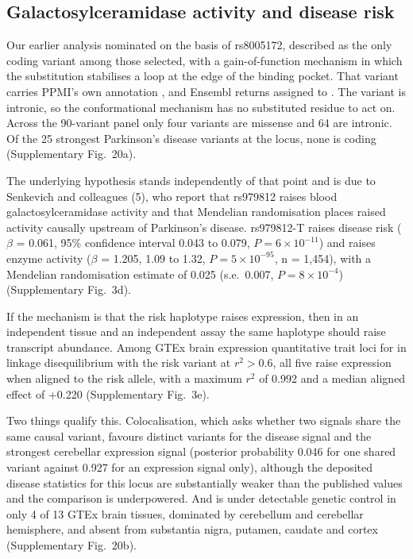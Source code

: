 \documentclass[10pt]{article}
\begin{document}
\subsection*{Galactosylceramidase activity and disease risk}

Our earlier analysis nominated  on the basis of rs8005172, described as the only
coding variant among those selected, with a gain-of-function mechanism in which the substitution
stabilises a loop at the edge of the binding pocket. That variant carries PPMI's own annotation
, and Ensembl returns  assigned to . The variant is intronic, so the conformational mechanism has no substituted residue to act on. Across the 90-variant panel only four variants are missense and 64 are intronic. Of the
25 strongest Parkinson's disease variants at the  locus, none is coding (Supplementary Fig.~20a).

The underlying hypothesis stands independently of that point and is due to Senkevich and colleagues (5), who report that rs979812 raises blood galactosylceramidase activity and that Mendelian
randomisation places raised activity causally upstream of Parkinson's disease. rs979812-T raises
disease risk ($\beta$ = 0.061, 95\% confidence interval 0.043 to 0.079, $P = 6\times10^{-11}$)
and raises enzyme activity ($\beta$ = 1.205, 1.09 to 1.32, $P = 5\times10^{-95}$, n = 1,454), with
a Mendelian randomisation estimate of 0.025 (s.e.\ 0.007, $P = 8\times10^{-4}$) (Supplementary Fig.~3d).

If the mechanism is that the risk haplotype raises  expression, then in an independent
tissue and an independent assay the same haplotype should raise  transcript abundance.
Among GTEx brain expression quantitative trait loci for
 in linkage disequilibrium with the risk variant at $r^2 > 0.6$, all five raise
 expression when aligned to the risk allele, with a maximum $r^2$ of 0.992 and a median
aligned effect of +0.220 (Supplementary Fig.~3e).

Two things qualify this. Colocalisation, which asks whether two signals share the same causal variant, favours distinct variants for the disease signal and the strongest cerebellar expression signal (posterior probability 0.046 for one shared
variant against 0.927 for an expression signal only), although the deposited disease statistics
for this locus are substantially weaker than the published values and the comparison is underpowered. And  is under detectable genetic control in only 4 of
13 GTEx brain tissues, dominated by cerebellum and cerebellar hemisphere, and absent from
substantia nigra, putamen, caudate and cortex (Supplementary Fig.~20b).
\end{document}
